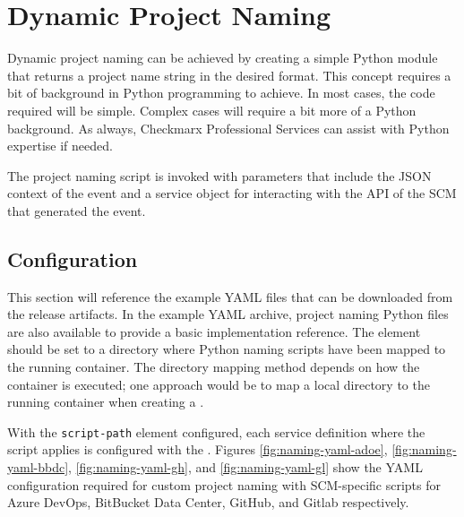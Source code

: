 \chapter{Dynamic Project Naming}\label{sec:project-naming}


Dynamic project naming can be achieved by creating a simple Python module that returns
a project name string in the desired format.  This concept requires a bit of background
in Python programming to achieve.  In most cases, the code required will be simple.
Complex cases will require a bit more of a Python background.  As always, 
Checkmarx Professional Services can assist with Python expertise if needed.

The project naming script is invoked with parameters that include the JSON context of the event
and a service object for interacting with the API of the SCM that generated the event.


\section{Configuration}

This section will reference the example YAML files that can be downloaded from the \cxoneflow release artifacts.
In the example YAML archive, project naming Python files are also available to provide a basic
implementation reference.  The  element
should be set to a directory where Python naming scripts have been mapped to the running \cxoneflow container.  
The directory mapping method depends on how the container is executed; one approach would be to map
a local directory to the running \cxoneflow container when creating a
.

With the \texttt{script-path} element configured, each service definition where the script applies
is configured with the .  Figures \ref{fig:naming-yaml-adoe},
\ref{fig:naming-yaml-bbdc}, \ref{fig:naming-yaml-gh}, and \ref{fig:naming-yaml-gl} show the YAML configuration
required for custom project naming with SCM-specific scripts for Azure DevOps, BitBucket Data Center, GitHub, and
Gitlab respectively.


